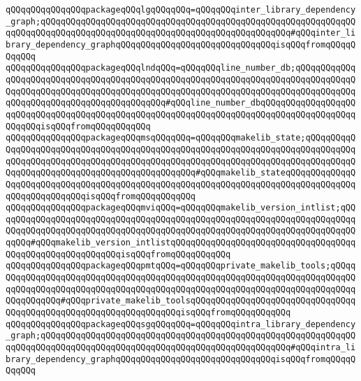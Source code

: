 \verb|qQQqqQQqqQQqqQQqpackageqQQqlgqQQqqQQq=qQQqqQQqinter_library_dependency_graph;qQQqqQQqqQQqqQQqqQQqqQQqqQQqqQQqqQQqqQQqqQQqqQQqqQQqqQQqqQQqqQQqqQQqqQQqqQQqqQQqqQQqqQQqqQQqqQQqqQQqqQQqqQQqqQQqqQQqqQQq#qQQqinter_library_dependency_graphqQQqqQQqqQQqqQQqqQQqqQQqqQQqqQQqisqQQqfromqQQqqQQqqQQq|\newline
\verb|qQQqqQQqqQQqqQQqpackageqQQqlndqQQq=qQQqqQQqline_number_db;qQQqqQQqqQQqqQQqqQQqqQQqqQQqqQQqqQQqqQQqqQQqqQQqqQQqqQQqqQQqqQQqqQQqqQQqqQQqqQQqqQQqqQQqqQQqqQQqqQQqqQQqqQQqqQQqqQQqqQQqqQQqqQQqqQQqqQQqqQQqqQQqqQQqqQQqqQQqqQQqqQQqqQQqqQQqqQQqqQQqqQQq#qQQqline_number_dbqQQqqQQqqQQqqQQqqQQqqQQqqQQqqQQqqQQqqQQqqQQqqQQqqQQqqQQqqQQqqQQqqQQqqQQqqQQqqQQqqQQqqQQqqQQqqQQqisqQQqfromqQQqqQQqqQQq|\newline
\verb|qQQqqQQqqQQqqQQqpackageqQQqmsqQQqqQQq=qQQqqQQqmakelib_state;qQQqqQQqqQQqqQQqqQQqqQQqqQQqqQQqqQQqqQQqqQQqqQQqqQQqqQQqqQQqqQQqqQQqqQQqqQQqqQQqqQQqqQQqqQQqqQQqqQQqqQQqqQQqqQQqqQQqqQQqqQQqqQQqqQQqqQQqqQQqqQQqqQQqqQQqqQQqqQQqqQQqqQQqqQQqqQQqqQQqqQQqqQQq#qQQqmakelib_stateqQQqqQQqqQQqqQQqqQQqqQQqqQQqqQQqqQQqqQQqqQQqqQQqqQQqqQQqqQQqqQQqqQQqqQQqqQQqqQQqqQQqqQQqqQQqqQQqqQQqisqQQqfromqQQqqQQqqQQq|\newline
\verb|qQQqqQQqqQQqqQQqpackageqQQqmviqQQq=qQQqqQQqmakelib_version_intlist;qQQqqQQqqQQqqQQqqQQqqQQqqQQqqQQqqQQqqQQqqQQqqQQqqQQqqQQqqQQqqQQqqQQqqQQqqQQqqQQqqQQqqQQqqQQqqQQqqQQqqQQqqQQqqQQqqQQqqQQqqQQqqQQqqQQqqQQqqQQqqQQqqQQq#qQQqmakelib_version_intlistqQQqqQQqqQQqqQQqqQQqqQQqqQQqqQQqqQQqqQQqqQQqqQQqqQQqqQQqqQQqisqQQqfromqQQqqQQqqQQq|\newline
\verb|qQQqqQQqqQQqqQQqpackageqQQqpmtqQQq=qQQqqQQqprivate_makelib_tools;qQQqqQQqqQQqqQQqqQQqqQQqqQQqqQQqqQQqqQQqqQQqqQQqqQQqqQQqqQQqqQQqqQQqqQQqqQQqqQQqqQQqqQQqqQQqqQQqqQQqqQQqqQQqqQQqqQQqqQQqqQQqqQQqqQQqqQQqqQQqqQQqqQQqqQQqqQQq#qQQqprivate_makelib_toolsqQQqqQQqqQQqqQQqqQQqqQQqqQQqqQQqqQQqqQQqqQQqqQQqqQQqqQQqqQQqqQQqqQQqisqQQqfromqQQqqQQqqQQq|\newline
\verb|qQQqqQQqqQQqqQQqpackageqQQqsgqQQqqQQq=qQQqqQQqintra_library_dependency_graph;qQQqqQQqqQQqqQQqqQQqqQQqqQQqqQQqqQQqqQQqqQQqqQQqqQQqqQQqqQQqqQQqqQQqqQQqqQQqqQQqqQQqqQQqqQQqqQQqqQQqqQQqqQQqqQQqqQQqqQQq#qQQqintra_library_dependency_graphqQQqqQQqqQQqqQQqqQQqqQQqqQQqqQQqisqQQqfromqQQqqQQqqQQq|\newline
